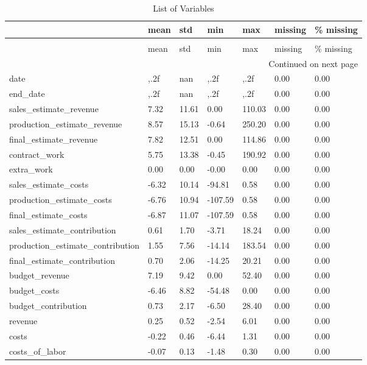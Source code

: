 \begin{landscape}\begin{longtable}[h!]{lllllll}
\caption{List of Variables} \label{eda_1} \\
\toprule
 & mean & std & min & max & missing & \% missing \\
\midrule
\endfirsthead
\caption[]{List of Variables} \\
\toprule
 & mean & std & min & max & missing & \% missing \\
\midrule
\endhead
\midrule
\multicolumn{7}{r}{Continued on next page} \\
\midrule
\endfoot
\bottomrule
\endlastfoot
date & ,.2f & nan & ,.2f & ,.2f & 0.00 & 0.00 \\
end_date & ,.2f & nan & ,.2f & ,.2f & 0.00 & 0.00 \\
sales_estimate_revenue & 7.32 & 11.61 & 0.00 & 110.03 & 0.00 & 0.00 \\
production_estimate_revenue & 8.57 & 15.13 & -0.64 & 250.20 & 0.00 & 0.00 \\
final_estimate_revenue & 7.82 & 12.51 & 0.00 & 114.86 & 0.00 & 0.00 \\
contract_work & 5.75 & 13.38 & -0.45 & 190.92 & 0.00 & 0.00 \\
extra_work & 0.00 & 0.00 & -0.00 & 0.00 & 0.00 & 0.00 \\
sales_estimate_costs & -6.32 & 10.14 & -94.81 & 0.58 & 0.00 & 0.00 \\
production_estimate_costs & -6.76 & 10.94 & -107.59 & 0.58 & 0.00 & 0.00 \\
final_estimate_costs & -6.87 & 11.07 & -107.59 & 0.58 & 0.00 & 0.00 \\
sales_estimate_contribution & 0.61 & 1.70 & -3.71 & 18.24 & 0.00 & 0.00 \\
production_estimate_contribution & 1.55 & 7.56 & -14.14 & 183.54 & 0.00 & 0.00 \\
final_estimate_contribution & 0.70 & 2.06 & -14.25 & 20.21 & 0.00 & 0.00 \\
budget_revenue & 7.19 & 9.42 & 0.00 & 52.40 & 0.00 & 0.00 \\
budget_costs & -6.46 & 8.82 & -54.48 & 0.00 & 0.00 & 0.00 \\
budget_contribution & 0.73 & 2.17 & -6.50 & 28.40 & 0.00 & 0.00 \\
revenue & 0.25 & 0.52 & -2.54 & 6.01 & 0.00 & 0.00 \\
costs & -0.22 & 0.46 & -6.44 & 1.31 & 0.00 & 0.00 \\
costs_of_labor & -0.07 & 0.13 & -1.48 & 0.30 & 0.00 & 0.00 \\

\end{longtable}
\end{landscape}
